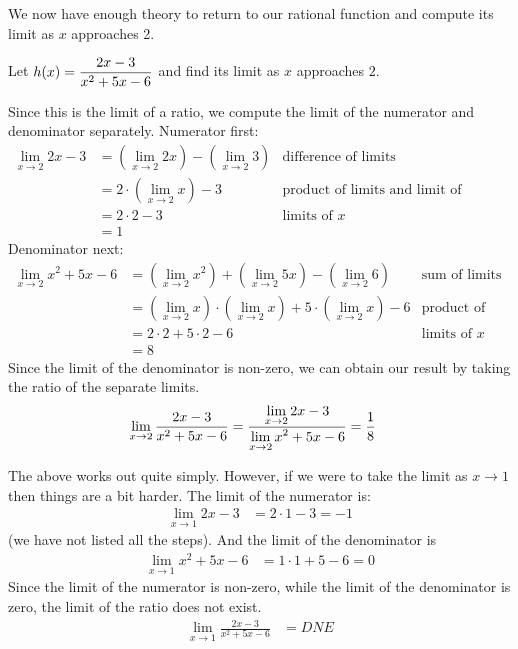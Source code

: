 We now have enough theory to return to our rational function and compute its
limit as $x$ approaches 2.
\begin{eg}
 Let $\displaystyle h(x) = \frac{2x-3}{x^2+5x-6}$ and find its limit as $x$ approaches
$2$.

Since this is the limit  of a ratio, we compute the limit of the numerator and
denominator separately.
Numerator first:
\begin{align*}
  \lim_{x \to 2} 2x-3
  &= \left( \lim_{x \to 2} 2x \right) - \left( \lim_{x \to 2} 3 \right)
  & \text{difference of limits} \\
  &= 2 \cdot \left( \lim_{x \to 2} x \right) -3
  & \text{product of limits and limit of constant} \\
  &= 2 \cdot 2 -3
  & \text{limits of $x$} \\
  &= 1
\end{align*}
Denominator next:
\begin{align*}
  \lim_{x \to 2} x^2+5x-6
  &= \left( \lim_{x \to 2} x^2 \right) + \left( \lim_{x \to 2} 5x \right)
  - \left( \lim_{x \to 2} 6 \right)
  & \text{sum of limits} \\
  &= \left( \lim_{x \to 2} x \right)\cdot \left( \lim_{x \to 2} x \right)
  + 5 \cdot \left( \lim_{x \to 2} x \right) - 6
  & \text{product of limits and limit of constant} \\
  &= 2 \cdot 2 + 5 \cdot 2 - 6
  & \text{limits of $x$} \\
  &= 8
\end{align*}
Since the limit of the denominator is non-zero, we can obtain our result by
taking the ratio of the separate limits.
\begin{align*}
\lim_{x \to 2} \frac{2x-3}{x^2+5x-6}
  &= \frac{\displaystyle \lim_{x \to 2} 2x-3}{\displaystyle \lim_{x \to 2} x^2+5x-6} = \frac{1}{8}
\end{align*}

The above works out quite simply. However, if we were to take the limit as $x
\to 1$ then things are a bit harder. The limit of the numerator is:
\begin{align*}
  \lim_{x \to 1} 2x-3 &= 2 \cdot 1 - 3 = -1
\end{align*}
(we have not listed all the steps). And the limit of the denominator is
\begin{align*}
  \lim_{x \to 1} x^2 +5x-6 &= 1 \cdot 1 + 5 - 6 = 0
\end{align*}
Since the limit of the numerator is non-zero, while the limit of the
denominator is zero, the limit of the ratio does not exist.
\begin{align*}
\lim_{x \to 1} \frac{2x-3}{x^2+5x-6}
  &= DNE
\end{align*}
\end{eg}
